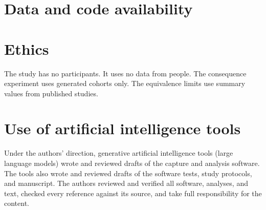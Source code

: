 \section*{Data and code availability}

\section*{Ethics}
The study has no participants.
It uses no data from people.
The consequence experiment uses generated cohorts only.
The equivalence limits use summary values from published studies.

\section*{Use of artificial intelligence tools}
Under the authors' direction, generative artificial intelligence tools (large language models) wrote and reviewed drafts of the capture and analysis software.
The tools also wrote and reviewed drafts of the software tests, study protocols, and manuscript.
The authors reviewed and verified all software, analyses, and text, checked every reference against its source, and take full responsibility for the content.
